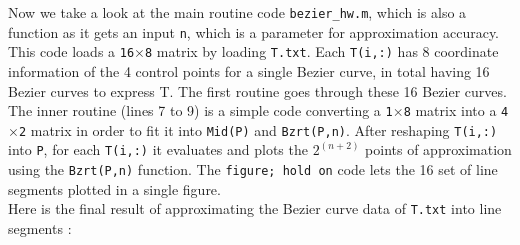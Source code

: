 \documentclass[paper=a4, fontsize=11pt]{scrartcl}
\begin{document}
Now we take a look at the main routine code \texttt{bezier\_hw.m}, which is also a function as it gets an input \texttt{n}, which is a parameter for approximation accuracy. This code loads a \texttt{16$\times$8} matrix by loading \texttt{T.txt}. Each \texttt{T(i,:)} has 8 coordinate information of the 4 control points for a single Bezier curve, in total having 16 Bezier curves to express T. The first routine goes through these 16 Bezier curves. The inner routine (lines 7 to 9) is a simple code converting a \texttt{1$\times$8} matrix into a \texttt{4$\times$2} matrix in order to fit it into \texttt{Mid(P)} and \texttt{Bzrt(P,n)}. After reshaping \texttt{T(i,:)} into \texttt{P}, for each \texttt{T(i,:)} it evaluates and plots the $2^{(n+2)}$ points of approximation using the \texttt{Bzrt(P,n)} function. The \texttt{figure; hold on} code lets the 16 set of line segments plotted in a single figure. \\


Here is the final result of approximating the Bezier curve data of \texttt{T.txt} into line segments : \\
\end{document}
